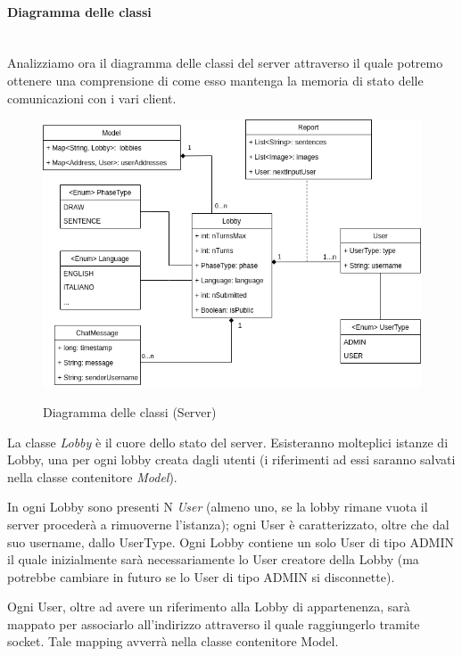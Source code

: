 \paragraph{Diagramma delle classi}\mbox{}\\
Analizziamo ora il diagramma delle classi del server attraverso il quale potremo ottenere una comprensione di come esso mantenga la memoria di stato delle comunicazioni con i vari client.
\begin{figure}[H]
    \caption{Diagramma delle classi (Server)}
    \centering
    \includegraphics[width=150mm]{img/ingSoft/Class Server.png}
    \label{fig:class_server}
\end{figure}
\noindent La classe \emph{Lobby} è il cuore dello stato del server. Esisteranno molteplici istanze di Lobby, una per ogni lobby creata dagli utenti (i riferimenti ad essi saranno salvati nella classe contenitore \emph{Model}).\newline

\noindent In ogni Lobby sono presenti N \emph{User} (almeno uno, se la lobby rimane vuota il server procederà a rimuoverne l'istanza); ogni User è caratterizzato, oltre che dal suo username, dallo UserType. Ogni Lobby contiene un solo User di tipo ADMIN il quale inizialmente sarà necessariamente lo User creatore della Lobby (ma potrebbe cambiare in futuro se lo User di tipo ADMIN si disconnette).\newline

\noindent Ogni User, oltre ad avere un riferimento alla Lobby di appartenenza, sarà mappato per associarlo all'indirizzo attraverso il quale raggiungerlo tramite socket. Tale mapping avverrà nella classe contenitore Model.\newline

